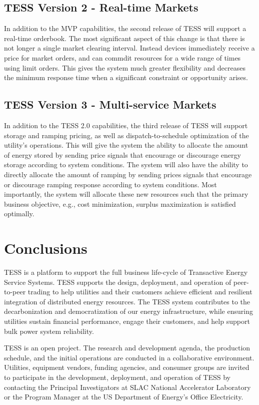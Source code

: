\documentclass[10pt,twocolumn]{article}
\begin{document}
\subsection{TESS Version 2 - Real-time Markets}

In addition to the MVP capabilities, the second release of TESS will support a real-time orderbook. The most significant aspect of this change is that there is not longer a single market clearing interval. Instead devices immediately receive a price for market orders, and can commdit resources for a wide range of times using limit orders. This gives the system much greater flexibility and decreases the minimum response time when a significant constraint or opportunity arises.

\subsection{TESS Version 3 - Multi-service Markets}

In addition to the TESS 2.0 capabilities, the third release of TESS will support storage and ramping pricing, as well as dispatch-to-schedule optimization of the utility's operations. This will give the system the ability to allocate the amount of energy stored by sending price signals that encourage or discourage energy storage according to system conditions.  The system will also have the ability to directly allocate the amount of ramping by sending prices signals that encourage or discourage ramping response according to system conditions.  Most importantly, the system will allocate these new resources such that the primary business objective, e.g., cost minimization, surplus maximization is satisfied optimally.

\section{Conclusions}

TESS is a platform to support the full business life-cycle of Transactive Energy Service Systems.  TESS supports the design, deployment, and operation of peer-to-peer trading to help utilities and their customers achieve efficient and resilient integration of distributed energy resources.  The TESS system contributes to the decarbonization and democratization of our energy infrastructure, while ensuring utilities sustain financial performance, engage their customers, and help support bulk power system reliability.

TESS is an open project. The research and development agenda, the production schedule, and the initial operations are conducted in a collaborative environment. Utilities, equipment vendors, funding agencies, and consumer groups are invited to participate in the development, deployment, and operation of TESS by contacting the Principal Investigators at SLAC National Accelerator Laboratory or the Program Manager at the US Department of Energy's Office Electricity.
\end{document}
